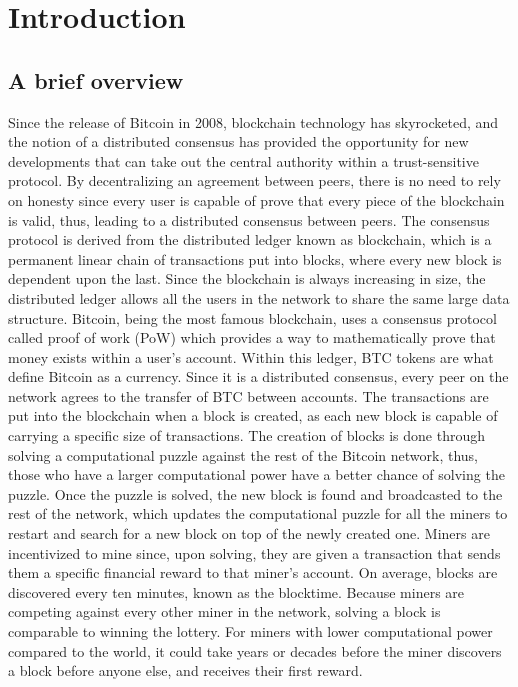 \documentclass[runningheads]{llncs}
\begin{document}
\section{Introduction}

\subsection{A brief overview}
Since the release of Bitcoin in 2008\cite{b1}, blockchain technology has skyrocketed, and the notion of a distributed consensus has provided the opportunity for new developments that can take out the central authority within a trust-sensitive protocol. By decentralizing an agreement between peers, there is no need to rely on honesty since every user is capable of prove that every piece of the blockchain is valid, thus, leading to a distributed consensus between peers. The consensus protocol is derived from the distributed ledger known as blockchain, which is a permanent linear chain of transactions put into blocks, where every new block is dependent upon the last. Since the blockchain is always increasing in size, the distributed ledger allows all the users in the network to share the same large data structure. Bitcoin, being the most famous blockchain, uses a consensus protocol called proof of work (PoW) which provides a way to mathematically prove that money exists within a user’s account. Within this ledger, BTC tokens are what define Bitcoin as a currency. Since it is a distributed consensus, every peer on the network agrees to the transfer of BTC between accounts. The transactions are put into the blockchain when a block is created, as each new block is capable of carrying a specific size of transactions. The creation of blocks is done through solving a computational puzzle against the rest of the Bitcoin network, thus, those who have a larger computational power have a better chance of solving the puzzle. Once the puzzle is solved, the new block is found and broadcasted to the rest of the network, which updates the computational puzzle for all the miners to restart and search for a new block on top of the newly created one. Miners are incentivized to mine since, upon solving, they are given a transaction that sends them a specific financial reward to that miner’s account. On average, blocks are discovered every ten minutes, known as the blocktime. Because miners are competing against every other miner in the network, solving a block is comparable to winning the lottery. For miners with lower computational power compared to the world, it could take years or decades before the miner discovers a block before anyone else, and receives their first reward. 
\end{document}
